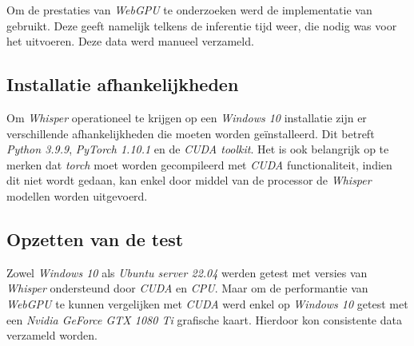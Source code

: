 \bigbreak{}

Om de prestaties van \textit{WebGPU} te onderzoeken werd de implementatie van \textcite{Fleetwood2024} gebruikt. Deze geeft namelijk telkens de inferentie tijd weer, die nodig was voor het uitvoeren. Deze data werd manueel verzameld.

\bigbreak{}

\subsection{Installatie afhankelijkheden}

Om \textit{Whisper} operationeel te krijgen op een \textit{Windows 10} installatie zijn er verschillende afhankelijkheden die moeten worden geïnstalleerd. Dit betreft \textit{Python 3.9.9}, \textit{PyTorch 1.10.1} en de \textit{CUDA toolkit}. Het is ook belangrijk op te merken dat \textit{torch} moet worden gecompileerd met \textit{CUDA} functionaliteit, indien dit niet wordt gedaan, kan enkel door middel van de processor de \textit{Whisper} modellen worden uitgevoerd.

\subsection{Opzetten van de test}

Zowel \textit{Windows 10} als \textit{Ubuntu server 22.04} werden getest met versies van \textit{Whisper} ondersteund door \textit{CUDA} en \textit{CPU}. Maar om de performantie van \textit{WebGPU} te kunnen vergelijken met \textit{CUDA} werd enkel op \textit{Windows 10} getest met een \textit{Nvidia GeForce GTX 1080 Ti} grafische kaart. Hierdoor kon consistente data verzameld worden.

\break{}



\begin{figure}
    \centering
    
\end{figure}

